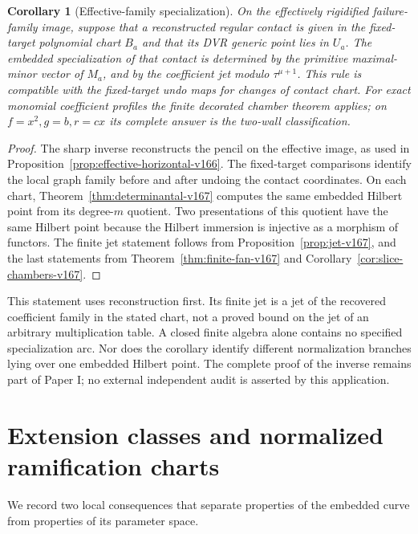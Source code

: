 \documentclass[11pt,reqno]{amsart}
\numberwithin{equation}{section}
\newtheorem{corollary}[theorem]{Corollary}
\theoremstyle{definition}\newtheorem{definition}[theorem]{Definition}
\theoremstyle{remark}\newtheorem{remark}[theorem]{Remark}
\begin{document}
\begin{corollary}[Effective-family specialization]
\label{cor:effective-states-v167}
On the effectively rigidified failure-family image, suppose that
a reconstructed regular contact is given in the fixed-target
polynomial chart $B_a$ and that its DVR generic point lies in
$U_a$. The embedded specialization of that contact is determined
by the primitive maximal-minor vector of $M_a$, and by the
coefficient jet modulo $\tau^{\mu+1}$. This rule is compatible
with the fixed-target undo maps for changes of contact chart.
For exact monomial coefficient profiles the finite decorated
chamber theorem applies; on $f=x^2,g=b,r=cx$ its complete answer
is the two-wall classification.
\end{corollary}
\begin{proof}
The sharp inverse reconstructs the pencil on the effective image,
as used in Proposition~\ref{prop:effective-horizontal-v166}.
The fixed-target comparisons identify the local graph family
before and after undoing the contact coordinates. On each chart,
Theorem~\ref{thm:determinantal-v167} computes the same embedded
Hilbert point from its degree-$m$ quotient. Two presentations
of this quotient have the same Hilbert point because the Hilbert
immersion is injective as a morphism of functors. The finite jet
statement follows from Proposition~\ref{prop:jet-v167}, and the
last statements from Theorem~\ref{thm:finite-fan-v167} and
Corollary~\ref{cor:slice-chambers-v167}.
\end{proof}
This statement uses reconstruction first. Its finite jet is a jet
of the recovered coefficient family in the stated chart, not a
proved bound on the jet of an arbitrary multiplication table.
A closed finite algebra alone contains no specified specialization
arc. Nor does the corollary identify different normalization
branches lying over one embedded Hilbert point. The complete
proof of the inverse remains part of Paper I; no external
independent audit is asserted by this application.

\appendix
\section{Extension classes and normalized ramification charts}
\label{sec:local-algebra-v167}
We record two local consequences that separate properties of the
embedded curve from properties of its parameter space.
\end{document}
